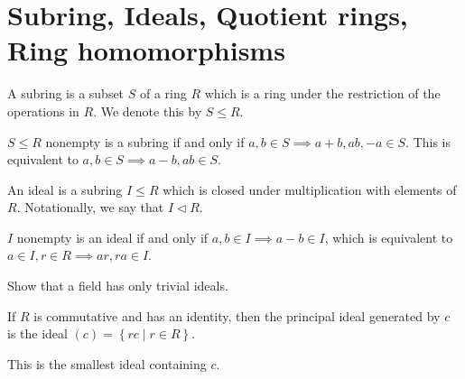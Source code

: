\documentclass{memoir}
\begin{document}
\section{Subring, Ideals, Quotient rings, Ring homomorphisms}	
\begin{defn}[Subring]
	A subring is a subset \(S\) of a ring \(R\) which is a ring under the restriction of the operations in \(R\). We denote this by \(S\leq R\).
\end{defn}

\begin{rmrk}
\(S\leq R\) nonempty is a subring if and only if \(a,b \in S \implies a+b, ab, -a \in S\). This is equivalent to \(a,b \in S \implies a-b, ab \in S\).
\end{rmrk}

\begin{defn}[Ideal]
	An ideal is a subring \(I \leq R\) which is closed under multiplication with elements of \(R\). Notationally, we say that \(I \triangleleft R\).
\end{defn}

\begin{rmrk}
\(I\) nonempty is an ideal if and only if \(a,b \in I \implies a-b \in I\), which is equivalent to \(a \in I, r \in R \implies ar, ra \in I\).
\end{rmrk}

\begin{hw}
Show that a field has only trivial ideals.
\end{hw}

\begin{defn}
	If \(R\) is commutative and has an identity, then the principal ideal generated by \(c\) is the ideal \((c) = \left\{rc \mid r \in R \right\} \). 
\end{defn}
This is the smallest ideal containing \(c\).
\end{document}
